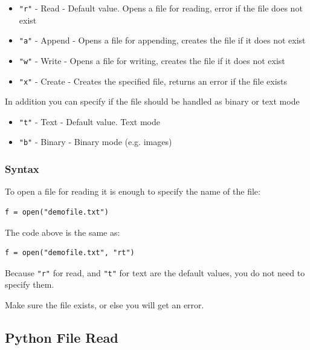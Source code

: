 \documentclass[12pt,a4paper]{article}
\newcommand{\code}[1]{%
	\colorbox{backcolour}{\lstinline{#1}}%
}
\begin{document}
\begin{itemize}
	\item \code{"r"} - Read - Default value. Opens a file for reading, error if the file does not exist
	\item \code{"a"} - Append - Opens a file for appending, creates the file if it does not exist
	\item \code{"w"} - Write - Opens a file for writing, creates the file if it does not exist
	\item \code{"x"} - Create - Creates the specified file, returns an error if the file exists
\end{itemize}

In addition you can specify if the file should be handled as binary or text
mode

\begin{itemize}
	\item \code{"t"} - Text - Default value. Text mode
	\item \code{"b"} - Binary - Binary mode (e.g. images)
\end{itemize}

\subsubsection{Syntax}

To open a file for reading it is enough to specify the name of the file:

\begin{ebox}
	\begin{lstlisting}
f = open("demofile.txt")
	\end{lstlisting}
\end{ebox}

The code above is the same as:

\begin{ebox}
	\begin{lstlisting}
f = open("demofile.txt", "rt")
	\end{lstlisting}
\end{ebox}

Because \code{"r"} for read, and \code{"t"} for text are the default values,
you do not need to specify them.

\begin{nbox}
Make sure the file exists, or else you will get an error.
\end{nbox}
\subsection{Python File Read}
\end{document}
